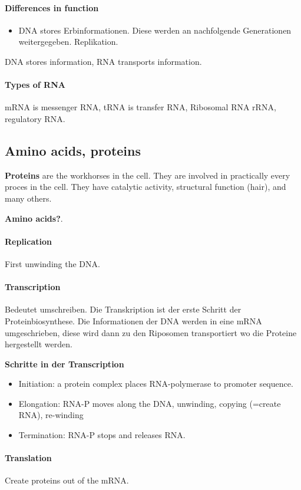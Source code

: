 \documentclass[10pt,a4paper]{article}
\begin{document}
\paragraph{Differences in function}
\begin{itemize}
\item DNA stores Erbinformationen. Diese werden an nachfolgende Generationen weitergegeben. Replikation.

\end{itemize}

DNA stores information, RNA transports information.

\paragraph{Types of RNA}
mRNA is messenger RNA, tRNA is transfer RNA, Ribosomal RNA rRNA, regulatory RNA.

\subsection{Amino acids, proteins}
\textbf{Proteins} are the workhorses in the cell. They are involved in practically every proces in the cell. They have catalytic activity, structural function (hair), and many others.

\textbf{Amino acids?}.

\paragraph{Replication}
First unwinding the DNA. 

\paragraph{Transcription}
Bedeutet umschreiben. Die Transkription ist der erste Schritt der Proteinbiosynthese.
Die Informationen der DNA werden in eine mRNA umgeschrieben, diese wird dann zu den Riposomen transportiert wo die Proteine hergestellt werden.

\textbf{Schritte in der Transcription}
\begin{itemize}
\item Initiation: a protein complex places RNA-polymerase to promoter sequence.
\item Elongation: RNA-P moves along the DNA, unwinding, copying (=create RNA), re-winding
\item Termination: RNA-P stops and releases RNA.
\end{itemize}

\paragraph{Translation}
Create proteins out of the mRNA.
\end{document}
